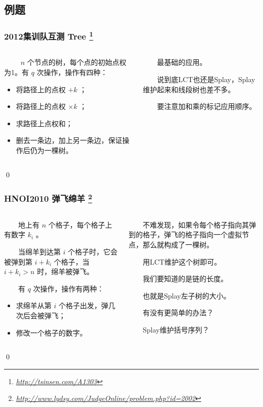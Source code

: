 \documentclass[9pt,dvipsnames,table]{beamer}
\newcommand{\hlink}[1]{
	\footnote{\fontsize{6pt}{\baselineskip}\href{#1}{\textsl{\underline{#1}}}}
}
\newenvironment{qedframe}{%
	\begin{frame}[environment=qedqedframe]%
	}{%
	\qed
	\end{frame}%
}
\begin{document}
\subsection{例题}
\begin{qedframe}
	\frametitle{2012集训队互测 Tree\hlink{http://tsinsen.com/A1303}}
	\begin{columns}
		\begin{column}{0.5\textwidth}
			　　 $ n $ 个节点的树，每个点的初始点权为1。有 $ q $ 次操作，操作有四种：
			\begin{itemize}
				\item 将路径上的点权 $ +k $ ；
				\item 将路径上的点权 $ \times k $ ；
				\item 求路径上点权和；
				\item 删去一条边，加上另一条边，保证操作后仍为一棵树。
			\end{itemize}
		\end{column} \pause
		\begin{column}{0.5\textwidth}
			　　最基础的应用。
			
			　　说到底LCT也还是Splay，Splay维护起来和线段树也差不多。
			
			　　要注意加和乘的标记应用顺序。
		\end{column}
	\end{columns}
\end{qedframe}
\begin{qedframe}
	\frametitle{HNOI2010 弹飞绵羊\hlink{http://www.lydsy.com/JudgeOnline/problem.php?id=2002}}
	\begin{columns}
		\begin{column}{0.5\textwidth}
			　　地上有 $ n $ 个格子，每个格子上有数字 $ k_i $ 。
			
			　　当绵羊到达第 $ i $ 个格子时，它会被弹到第 $ i+k_i $ 个格子，当 $ i+k_i>n $ 时，绵羊被弹飞。
			
			　　有 $ q $ 次操作，操作有两种：
			\begin{itemize}
				\item 求绵羊从第 $ i $ 个格子出发，弹几次后会被弹飞；
				\item 修改一个格子的数字。
			\end{itemize}
		\end{column} \pause
		\begin{column}{0.5\textwidth}
			　　不难发现，如果令每个格子指向其弹到的格子，弹飞的格子指向一个虚拟节点，那么就构成了一棵树。
			
			　　用LCT维护这个树即可。
			
			　　我们要知道的是链的长度。
			
			　　也就是Splay左子树的大小。
			
			　　有没有更简单的办法？\pause
			
			　　Splay维护括号序列？
		\end{column}
	\end{columns}
\end{qedframe}
\end{document}

